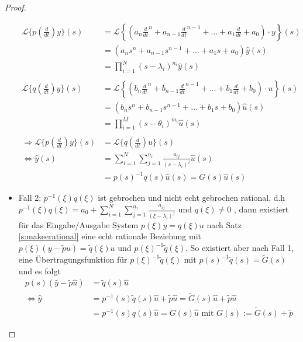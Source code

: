 \begin{satz}
\begin{proof}
\begin{itemize}
		\begin{align}
			\mathscr{L}\{p(\frac{d}{dt})y\}(s) &= \mathscr{L}\left\{(a_n \frac{d}{dt}^n  + a_{n-1} \frac{d}{dt}^{n-1} + \hdots + a_1 \frac{d}{dt} + a_0)\cdot y\right\}(s) \\
			&=  (a_n s^n  + a_{n-1} s^{n-1} + \hdots + a_1 s + a_0)\hat{y}(s)\\
			&= \prod_{i=1}^N{(s -\lambda_i)^{n_i}} \hat{y}(s)\\\\
			\mathscr{L}\{q(\frac{d}{dt})y\}(s) &= \mathscr{L}\left\{(b_n \frac{d}{dt}^n  + b_{n-1} \frac{d}{dt}^{n-1} + \hdots + b_1 \frac{d}{dt} + b_0)\cdot u\right\}(s) \\
			&=  (b_n s^n  + b_{n-1} s^{n-1} + \hdots + b_1 s + b_0)\hat{u}(s)\\
			&= \prod_{i=1}^M{(s -\theta_i)^{m_i}} \hat{u}(s)\\\\
			\Rightarrow {\mathscr{L}\{p(\frac{d}{dt})y\}(s)} &= {\mathscr{L}\{q(\frac{d}{dt})u\}(s)} \\
			\Leftrightarrow \hat{y}(s) &= \sum_{i=1}^{N}{\sum^{n_i}_{j=1}{\frac{a_{ij}}{(s - \lambda_i)^j}}} \hat{u}(s)\\ 
			&= p(s)^{-1}q(s)\hat{u}(s) = G(s)\hat{u}(s)
		\end{align}
		\item Fall 2: $p^{-1}(\xi) q(\xi)$ ist gebrochen und nicht echt gebrochen rational, d.h $p^{-1}(\xi) q(\xi) = a_0 +\sum_{i=1}^{N}{\sum^{n_i}_{j=1}{\frac{a_{ij}}{(\xi - \lambda_i)^j}}}$ und $q(\xi) \neq 0$ , dann existiert für das Eingabe/Ausgabe System $p(\xi)y = q(\xi)u$ nach Satz \ref{s:makeerational} eine echt rationale Beziehung mit
		$p(\xi) (y - \tilde{p}u) = \tilde{q}(\xi)u$ und $p(\xi)^{-1}\tilde{q}(\xi)$. So existiert aber nach Fall 1, eine Übertragungsfunktion für $p(\xi)^{-1}\tilde{q}(\xi)$ mit $p(s)^{-1}\tilde{q}(s) = \tilde{G}(s)$ und es folgt
		\begin{align}
			p(s) (\hat{y} - \tilde{p}\hat{u}) &= \tilde{q}(s)\hat{u} \\
			\Leftrightarrow \hat{y}  &= p^{-1}(s)\tilde{q}(s) \hat{u} + \tilde{p} \hat{u} = \tilde{G}(s) \hat{u} + \tilde{p} \hat{u}\\
			&= p^{-1}(s) q(s) \hat{u} = G(s) \hat{u} \text{ mit }G(s) := \tilde{G}(s) + \tilde{p}
		\end{align}
	\end{itemize}
\end{proof}
\end{satz}
